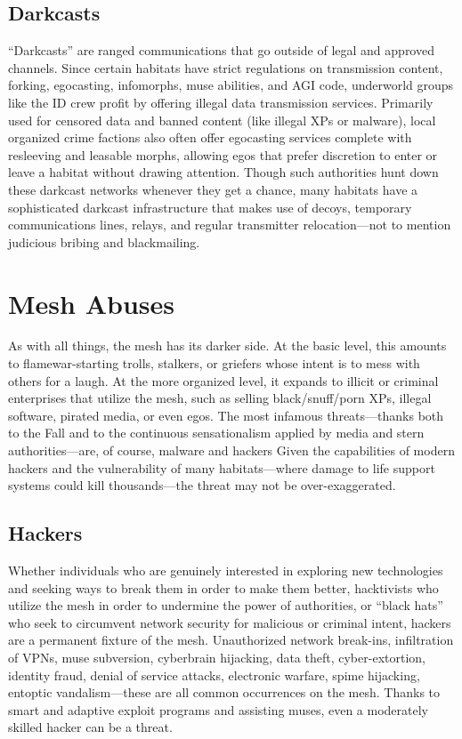 \subsection{Darkcasts} 

``Darkcasts'' are ranged communications that go outside of legal and approved channels. Since certain habitats have strict regulations on transmission content, forking, egocasting, infomorphs, muse abilities, and AGI code, underworld groups like the ID crew profit by offering illegal data transmission services. Primarily used for censored data and banned content (like illegal XPs or malware), local organized crime factions also often offer egocasting services complete with resleeving and leasable morphs, allowing egos that prefer discretion to enter or leave a habitat without drawing attention. Though such authorities hunt down these darkcast networks whenever they get a chance, many habitats have a sophisticated darkcast infrastructure that makes use of decoys, temporary communications lines, relays, and regular transmitter relocation—not to mention judicious bribing and blackmailing. 

\section{Mesh Abuses} 

As with all things, the mesh has its darker side. At the basic level, this amounts to flamewar-starting trolls, stalkers, or griefers whose intent is to mess with others for a laugh. At the more organized level, it expands to illicit or criminal enterprises that utilize the mesh, such as selling black/snuff/porn XPs, illegal software, pirated media, or even egos. The most infamous threats—thanks both to the Fall and to the continuous sensationalism applied by media and stern authorities—are, of course, malware and hackers Given the capabilities of modern hackers and the vulnerability of many habitats—where damage to life support systems could kill thousands—the threat may not be over-exaggerated. 

\subsection{Hackers} 

Whether individuals who are genuinely interested in exploring new technologies and seeking ways to break them in order to make them better, hacktivists who utilize the mesh in order to undermine the power of authorities, or ``black hats'' who seek to circumvent network security for malicious or criminal intent, hackers are a permanent fixture of the mesh. Unauthorized network break-ins, infiltration of VPNs, muse subversion, cyberbrain hijacking, data theft, cyber-extortion, identity fraud, denial of service attacks, electronic warfare, spime hijacking, entoptic vandalism—these are all common occurrences on the mesh. Thanks to smart and adaptive exploit programs and assisting muses, even a moderately skilled hacker can be a threat. 

